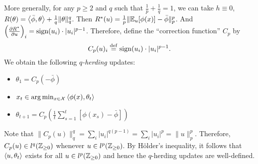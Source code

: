 \documentclass[paper.tex]{subfiles}
\begin{document}
More generally, for any 
$p \geq 2$ and $q$ such that $\frac{1}{p} + \frac{1}{q} = 1$, we can take 
$h \equiv 0$, $R(\theta) = \left\langle \bar{\phi}, \theta \right\rangle + \frac{1}{q}\|\theta\|_q^q$. 
Then $R^*(u) = \frac{1}{p}\|\mathbb{E}_{u}[\phi(x)]-\bar{\phi}\|_p^p$. And 
$\left(\frac{\partial R^*}{\partial u}\right)_i = \operatorname{sign}(u_i) \cdot |u_i|^{p-1}$. 
Therefore, define the ``correction function'' $C_p$ by
\begin{equation}
C_p(u)_i \stackrel{\mathrm{def}}{=} \operatorname{sign}(u_i) \cdot |u_i|^{p-1}.
\end{equation}
We obtain the following \emph{$q$-herding} updates:
\begin{itemize}
\item $\theta_{1} = C_p(-\bar{\phi})$
\item $x_{t} \in \arg\min_{x \in \mathcal{X}} \left\langle \phi(x), \theta_t \right\rangle$
\item $\theta_{t+1} = C_p\left(\frac{1}{t} \sum_{s=1}^t [\phi(x_s)-\bar{\phi}]\right)$
\end{itemize}
Note that $\|C_p(u)\|_q^q = \sum_{i} |u_i|^{q(p-1)} = \sum_{i} |u_i|^p = \|u\|_p^p$. 
Therefore, $C_p(u) \in l^q(\mathbb{Z}_{\geq 0})$ whenever $u \in l^p(\mathbb{Z}_{\geq 0})$. By 
H\"{o}lder's inequality, it follows that $\left\langle u, \theta_t \right\rangle$ exists for all 
$u \in l^p(\mathbb{Z}_{\geq 0})$ and hence the $q$-herding updates are well-defined.
\end{document}
